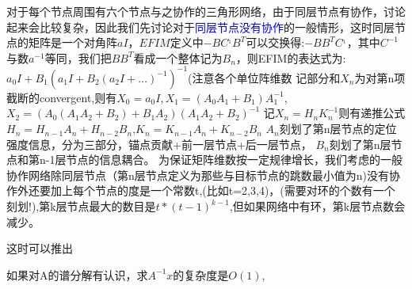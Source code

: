\documentclass[12pt]{article}
\theoremstyle{remark}
\begin{document}
对于每个节点周围有六个节点与之协作的三角形网络，由于同层节点有协作，讨论起来会比较复杂，因此我们先讨论对于\textcolor{blue}{同层节点没有协作}的一般情形，这时同层节点的矩阵是一个对角阵$aI$，$EFIM$定义中$-BC^{_1}B^T$可以交换得:$-BB^TC^{_1}$，其中$C^{-1}$与数$a^{-1}$等同，我们把$BB^T$看成一个整体记为$B_n$，则EFIM的表达式为:
$a_0I+B_1(a_1I+B_2(a_2I+\dots)^{-1})^{-1}$(注意各个单位阵维数
记部分和$X_n$为对第n项截断的convergent,则有$X_0=a_0I,X_1=(A_0A_1+B_1)A_1^{-1}$,$X_2=(A_0(A_1A_2+B_2)+B_1A_2)(A_1A_2+B_2)^{-1}$
记$X_n=H_nK_n^{-1}$则有递推公式$H_n=H_{n-1}A_n+H_{n-2}B_n$,$K_n=K_{n-1}A_n+K_{n-2}B_n$
$A_n$刻划了第n层节点的定位强度信息，分为三部分，锚点贡献+前一层节点+后一层节点，
$B_n$刻划了第n层节点和第n-1层节点的信息耦合。
为保证矩阵维数按一定规律增长，我们考虑的一般协作网络除同层节点（第n层节点定义为那些与目标节点的跳数最小值为n)没有协作外还要加上每个节点的度是一个常数t,(比如t=2,3,4)，(需要对环的个数有一个刻划!),第k层节点最大的数目是$t*(t-1)^{k-1}$,但如果网络中有环，第k层节点数会减少。

这时可以推出

如果对A的谱分解有认识，求$A^{-1}x$的复杂度是$O(1)$,
\end{document}
